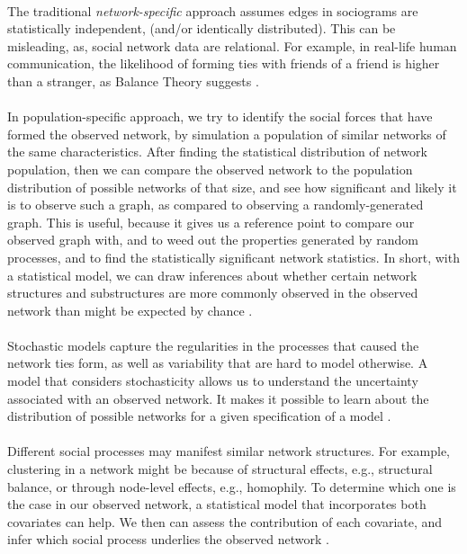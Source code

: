 \documentclass{report}
\begin{document}
\paragraph{} The traditional \textit{network-specific} approach assumes edges in sociograms are statistically independent, (and/or identically distributed). This can be misleading, as, social network data are relational. For example, in real-life human communication, the likelihood of forming ties with friends of a friend is higher than a stranger, as Balance Theory suggests \cite{Heider}. \paragraph{} In population-specific approach, we try to identify the social forces that have formed the observed network, by simulation a population of similar networks of the same characteristics. After finding the statistical distribution of network population, then we can compare the observed network to the population distribution of possible networks of that size, and see how significant and likely it is to observe such a graph, as compared to observing a randomly-generated graph. This is useful, because it gives us a reference point to compare our observed graph with, and to weed out the properties generated by random processes, and to find the statistically significant network statistics. In short, with a statistical model, we can draw inferences about whether certain network structures and substructures are more commonly observed in the observed network than might be expected by chance \cite{Robins}. \paragraph{} Stochastic models capture the regularities in the processes that caused the network ties form, as well as variability that are hard to model otherwise. A model that considers stochasticity allows us to understand the uncertainty associated with an observed network. It makes it possible to learn about the distribution of possible networks for a given specification of a model \cite{Robins}. \paragraph{} Different social processes may manifest similar network structures. For example, clustering in a network might be because of structural effects, e.g., structural balance, or through node-level effects, e.g., homophily. To determine which one is the case in our observed network, a statistical model that incorporates both covariates can help. We then can assess the contribution of each covariate, and infer which social process underlies the observed network \cite{Robins}. 
\end{document}
